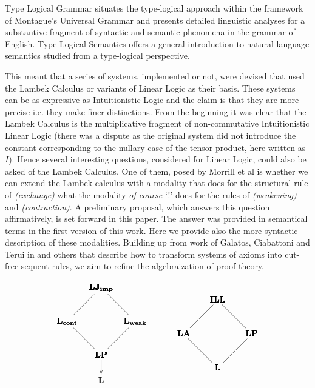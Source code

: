 \documentclass{article}
\begin{document}
Type Logical Grammar situates the type-logical approach within the
framework of Montague's Universal Grammar and presents detailed
linguistic analyses for a substantive fragment of syntactic and
semantic phenomena in the grammar of English.  Type Logical Semantics
offers a general introduction to natural language semantics studied
from a type-logical perspective.



This meant that a series of systems, implemented or not, were devised
that used the Lambek Calculus or variants of Linear Logic as their
basis. These systems can be as expressive as Intuitionistic Logic and
the claim is that they are more precise i.e. they make finer
distinctions.  From the beginning it was clear that the Lambek
Calculus is the multiplicative fragment of non-commutative
Intuitionistic Linear Logic (there was a dispute as the original
system did not introduce the constant corresponding to the nullary
case of the tensor product, here written as $I$).  Hence several
interesting questions, considered for Linear Logic, could also be
asked of the Lambek Calculus.  One of them, posed by Morrill et al is
whether we can extend the Lambek calculus with a modality that does
for the structural rule of \textit{(exchange)} what the modality
\textit{of course} `!' does for the rules of \textit{(weakening)} and
\textit{(contraction)}.  A preliminary proposal, which answers this
question affirmatively, is set forward in this paper. The answer was
provided in semantical terms in the first version of this work. Here
we provide also the more syntactic description of these
modalities. Building up from work of Galatos, Ciabattoni and Terui in
\cite{galatos2008} and others that describe how to transform systems
of axioms into cut-free sequent rules, we aim to refine the
algebraization of proof theory.


\[
\begin{array}{lll}
  \bfig
  \Ctriangle/-``-/<400,400>[
    \textbf{LJ}_{\textbf{imp}}`
    \textbf{L}_{\textbf{cont}}`
    \textbf{LP};``]

  \Dtriangle(400,0)/`-`-/<400,400>[
    \textbf{LJ}_{\textbf{imp}}`
    \textbf{L}_{\textbf{weak}}`
    \textbf{LP};``]

  \morphism(400,0)<0,-300>[\textbf{LP}`\textbf{L};]
  \efig
  & \quad &
  \bfig
  \Ctriangle/-``-/<400,400>[
    \textbf{ILL}`
    \textbf{LA}`
    \textbf{L};``]

  \Dtriangle(400,0)/`-`-/<400,400>[
    \textbf{ILL}`
    \textbf{LP}`
    \textbf{L};``]
  \efig
\end{array}
\]
\end{document}
